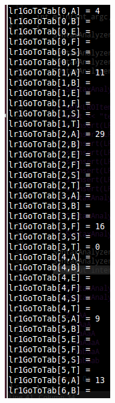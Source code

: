 \documentclass{article}
\begin{document}
\begin{CJK*}{UTF8}{gbsn}
\begin{figure}
\begin{subfigure}[b]{0.25\textwidth}
                \includegraphics[width=\textwidth]{lr1gototab.png}

\end{subfigure}
\end{figure}
\end{CJK*}
\end{document}
